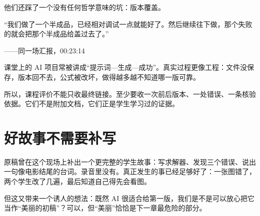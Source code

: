 他们还踩了一个没有任何哲学意味的坑：版本覆盖。

\begin{shiyu-inline}
``我们做了一个半成品，已经相对调试一点就能好了。然后继续往下做，那个失败的就会把那个半成品给盖过去了。''

\hfill ——同一场汇报，00:23:14
\end{shiyu-inline}

课堂上的 AI 项目常被讲成“提示词—生成—成功”。真实过程更像工程：文件没保存，版本回不去，公式被改坏，做得越多越不知道哪一版可靠。

所以，课程评价不能只收最终链接。至少要收一次前后版本、一处错误、一条核验依据。它们不是附加文档，它们正是学生学习过的证据。

\section{好故事不需要补写}

原稿曾在这个现场上补出一个更完整的学生故事：写求解器、发现三个错误、说出一句像电影结尾的台词。录音里没有。真正发生的事已经足够好了：一张图错了，两个学生改了几遍，最后知道自己得先会看图。

但这又带来一个诱人的想法：既然 AI 很适合给第一版，我们是不是可以放心把它当作“美丽的初稿”？可以，但“美丽”恰恰是下一章最危险的部分。

